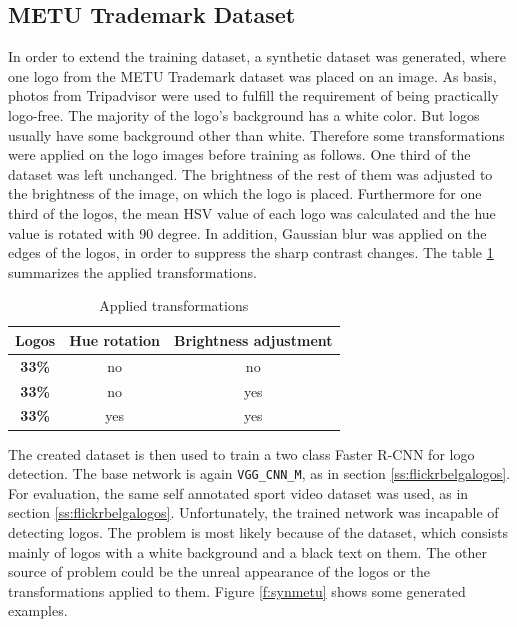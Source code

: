 \subsection{METU Trademark Dataset}\label{ss:metu}

In order to extend the training dataset, a synthetic dataset was generated, where one logo from the METU Trademark dataset \cite{DBLP:journals/corr/TursunAK17} was placed on an image. As basis, photos from Tripadvisor were used to fulfill the requirement of being practically logo-free. The majority of the logo's background has a white color. But logos usually have some background other than white. Therefore some transformations were applied on the logo images before training as follows. One third of the dataset was left unchanged. The brightness of the rest of them was adjusted to the brightness of the image, on which the logo is placed. Furthermore for one third of the logos, the mean HSV value of each logo was calculated and the hue value is rotated with 90 degree. In addition, Gaussian blur was applied on the edges of the logos, in order to suppress the sharp contrast changes. The table \ref{table:logotransformations} summarizes the applied transformations.

\begin{table}[ht!]
\centering
\begin{tabular}{|c|c|c|}
\hline \textbf{Logos} & \textbf{Hue rotation} & \textbf{Brightness adjustment} \\
\hline
\textbf{33\%} & no & no \\
\hline
\textbf{33\%} & no & yes \\
\hline
\textbf{33\%} & yes & yes \\ \hline
\end{tabular}
\caption{Applied transformations}
\label{table:logotransformations}
\end{table}

The created dataset is then used to train a two class Faster R-CNN for logo detection. The base network is again \texttt{VGG\_CNN\_M}, as in section \ref{ss:flickrbelgalogos}. For evaluation, the same self annotated sport video dataset was used, as in section \ref{ss:flickrbelgalogos}. Unfortunately, the trained network was incapable of detecting logos. The problem is most likely because of the dataset, which consists mainly of logos with a white background and a black text on them. The other source of problem could be the unreal appearance of the logos or the transformations applied to them. Figure \ref{f:synmetu} shows some generated examples.

